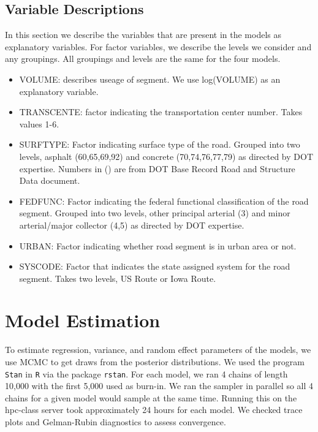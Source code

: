 \documentclass[a4paper]{article}\usepackage[]{graphicx}\usepackage[]{color}
\begin{document}
\subsection{Variable Descriptions}
In this section we describe the variables that are present in the models as explanatory variables. For factor variables, we describe the levels we consider and any groupings. All groupings and levels are the same for the four models.

\begin{itemize}
\item
VOLUME: describes useage of segment. We use log(VOLUME) as an explanatory variable.

\item
TRANSCENTE: factor indicating the transportation center number. Takes values 1-6.

\item
SURFTYPE: Factor indicating surface type of the road. Grouped into two levels, asphalt (60,65,69,92) and concrete (70,74,76,77,79) as directed by DOT expertise. Numbers in () are from DOT Base Record Road and Structure Data document.

\item
FEDFUNC: Factor indicating the federal functional classification of the road segment. Grouped into two levels, other principal arterial (3) and minor arterial/major collector (4,5) as directed by DOT expertise.

\item
URBAN: Factor indicating whether road segment is in urban area or not.

\item
SYSCODE: Factor that indicates the state assigned system for the road segment. Takes two levels, US Route or Iowa Route.

\end{itemize}

\section{Model Estimation}
To estimate regression, variance, and random effect parameters of the models, we use MCMC to get draws from the posterior distributions. We used the program \texttt{Stan} in \texttt{R} via the package \texttt{rstan}. For each model, we ran 4 chains of length 10,000 with the first 5,000 used as burn-in. We ran the sampler in parallel so all 4 chains for a given model would sample at the same time. Running this on the hpc-class server took approximately 24 hours for each model. We checked trace plots and Gelman-Rubin diagnostics to assess convergence. 
\end{document}
